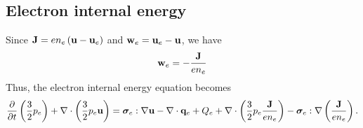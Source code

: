 \documentclass[a4paper,11pt]{report}
\begin{document}
\subsection{Electron internal energy}

Since $\mathbf{J} = e n_e \left( \mathbf{u} - \mathbf{u}_e \right)$ and $\mathbf{w}_e = \mathbf{u}_e - \mathbf{u}$, we have
\begin{equation}
    \label{eq:mhd_from_w_to_J}
    \mathbf{w}_e = -\frac{\mathbf{J}}{e n_e} 
\end{equation}
Thus, the electron internal energy equation becomes
\begin{equation*}
    \frac{\partial}{\partial t} \left( \frac{3}{2} p_e \right) + \nabla \cdot \left( \frac{3}{2} p_e \mathbf{u} \right) = \bm \sigma_e : \nabla \mathbf{u} - \nabla \cdot \mathbf{q}_e + Q_e + \nabla \cdot \left( \frac{3}{2} p_e \frac{\mathbf{J}}{e n_e} \right) - \bm \sigma_e : \nabla \left( \frac{\mathbf{J}}{e n_e} \right).
\end{equation*}
\end{document}
